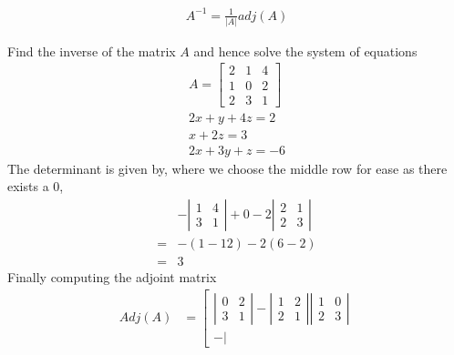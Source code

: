\documentclass[a4paper]{article}
\theoremstyle{plain}
\theoremstyle{definition}
\newtheorem{exmp}{Example}[section]
\theoremstyle{remark}
\begin{document}
\begin{align*}
	A^{-1} = \frac{1}{|A|}adj(A)
\end{align*}
\begin{tcolorbox}[colback=black!3!white,colframe=black!60!white,title=\begin{exmp}Finding inverse using adjoint \label{Finding inverse using adjoint}\end{exmp}]
       Find the inverse of the matrix $A$ and hence solve the system of equations 
                \begin{align}
			A = \begin{bmatrix} 2 & 1 & 4 \\
				1 & 0 & 2 \\
				2 & 3 & 1
			\end{bmatrix}  \\
			2x +y +4z = 2 \\
			x+2z = 3 \\
			2x+3y+z=-6
                \end{align}
		The determinant is given by, where we choose the middle row for ease as there exists a $0$,
		\begin{align}&-\left|
			\begin{array}{cc}
				1 & 4 \\
				3 & 1
			\end{array}\right| + 0 -2\left| \begin{array}{cc}
				2 & 1 \\
				2 & 3
			\end{array}\right| \\
			=& -(1-12) -2(6-2) \\
			=& 3
		\end{align}
		Finally computing the adjoint matrix
		\begin{align}
			Adj(A) &=
			\left[ \begin{array}{ccc}
			\left|	\begin{array}{cc}
				0 & 2 \\
				3 & 1
				\end{array}\right| -
			\left|	\begin{array}{cc}
				1 & 2 \\
				2 & 1
				\end{array}\right|
			\left|	\begin{array}{cc}
				1 & 0 \\
				2 & 3
				\end{array}\right| \\
		-	\left|	\begin{array}{cc}

\end{array}
\end{array}
\end{align}
\end{tcolorbox}
\end{document}
